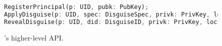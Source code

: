 \begin{figure}[t]
\begin{lstlisting}[language=Rust, style=rust]
RegisterPrincipal(p: UID, pubk: PubKey);
ApplyDisguise(p: UID, spec: DisguiseSpec, privk: PrivKey, locs: Vec<Locator>) -> (DisguiseID, Vec<Locator>);
RevealDisguise(p: UID, did: DisguiseID, privk: PrivKey, locs: Locator);
\end{lstlisting}
\caption{\sys's higher-level API.}
\label{f:api-high}
\end{figure}

